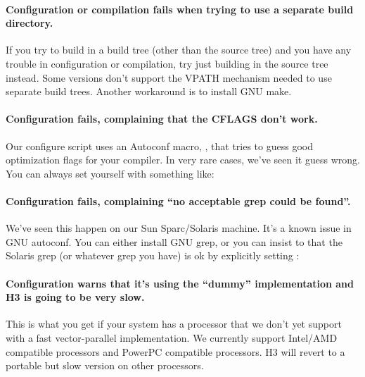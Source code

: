 \paragraph{Configuration or compilation fails when trying to use a
  separate build directory.}  If you try to build in a build tree
(other than the source tree) and you have any trouble in configuration
or compilation, try just building in the source tree instead. Some
 versions don't support the VPATH mechanism needed to use
separate build trees. Another workaround is to install GNU make.

\paragraph{Configuration fails, complaining that the CFLAGS don't
  work.} Our configure script uses an Autoconf macro,
  , that tries to guess good optimization flags
  for your compiler. In very rare cases, we've seen it guess wrong.
  You can always set  yourself with something like:


\paragraph{Configuration fails, complaining ``no acceptable grep could
  be found''.} We've seen this happen on our Sun Sparc/Solaris
machine. It's a known issue in GNU autoconf. You can either install
GNU grep, or you can insist to  that the Solaris
grep (or whatever grep you have) is ok by explicitly setting
:


\paragraph{Configuration warns that it's using the ``dummy''
implementation and H3 is going to be very slow.} This is what you get if
your system has a processor that we don't yet support with a fast
vector-parallel implementation. We currently support Intel/AMD
compatible processors and PowerPC compatible processors.  H3 will
revert to a portable but slow version on other processors.

